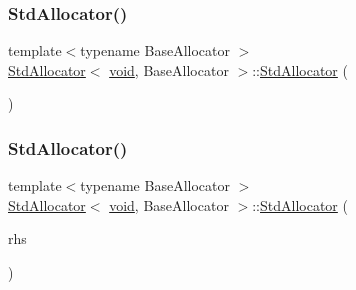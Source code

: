 \subsubsection{\texorpdfstring{Std\+Allocator()}{StdAllocator()}\hspace{0.1cm}{\footnotesize\ttfamily [1/4]}}
{\footnotesize\ttfamily template$<$typename Base\+Allocator $>$ \\
\hyperlink{classStdAllocator}{Std\+Allocator}$<$ \hyperlink{imgui__impl__opengl3__loader_8h_ac668e7cffd9e2e9cfee428b9b2f34fa7}{void}, Base\+Allocator $>$\+::\hyperlink{classStdAllocator}{Std\+Allocator} (\begin{DoxyParamCaption}{ }\end{DoxyParamCaption})\hspace{0.3cm}{\ttfamily [inline]}}

\mbox{\label{classStdAllocator_3_01void_00_01BaseAllocator_01_4_ab7d8af9c46aaee8e3e2c60b95b1d595d}} 
\subsubsection{\texorpdfstring{Std\+Allocator()}{StdAllocator()}\hspace{0.1cm}{\footnotesize\ttfamily [2/4]}}
{\footnotesize\ttfamily template$<$typename Base\+Allocator $>$ \\
\hyperlink{classStdAllocator}{Std\+Allocator}$<$ \hyperlink{imgui__impl__opengl3__loader_8h_ac668e7cffd9e2e9cfee428b9b2f34fa7}{void}, Base\+Allocator $>$\+::\hyperlink{classStdAllocator}{Std\+Allocator} (\begin{DoxyParamCaption}\item[{const \hyperlink{classStdAllocator}{Std\+Allocator}$<$ \hyperlink{imgui__impl__opengl3__loader_8h_ac668e7cffd9e2e9cfee428b9b2f34fa7}{void}, Base\+Allocator $>$ \&}]{rhs }\end{DoxyParamCaption})\hspace{0.3cm}{\ttfamily [inline]}}

\mbox{\label{classStdAllocator_3_01void_00_01BaseAllocator_01_4_a47cf6d8a7f37c6f1c03c158948d88553}} 
